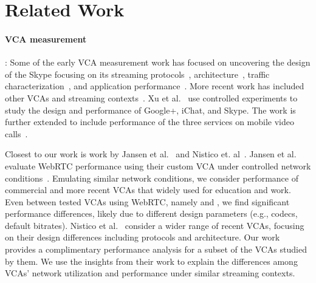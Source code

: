 \section{Related Work}\label{sec:related}

\paragraph{VCA measurement}: Some of the early VCA measurement work has focused on uncovering the design of the Skype focusing on its streaming protocols~\cite{baset2004analysis}, architecture~\cite{guha2005experimental}, traffic characterization~\cite{bonfiglio2008tracking}, and application performance~\cite{hossfeld2008analysis}. More recent work has included other VCAs and streaming contexts~\cite{xu2012video, yu2014can, azfar2016android}. Xu et al.~\cite{xu2012video} use controlled experiments to study the design and performance of Google+, iChat, and Skype. The work is further extended to include performance of the three services on mobile video calls~\cite{yu2014can}. 

Closest to our work is work by Jansen et al.~\cite{jansen2018performance} and Nistico et. al~\cite{nistico2020comparative}. Jansen et al. evaluate WebRTC performance using their custom VCA under controlled network conditions~\cite{jansen2018performance}. Emulating similar network conditions, we consider performance of commercial and more recent VCAs that widely used for education and work. Even between tested VCAs using WebRTC, namely \meet and \teamsbrowser, we find significant performance differences, likely due to different design parameters (e.g., codecs, default bitrates). Nistico et al.~\cite{nistico2020comparative} consider a wider range of recent VCAs, focusing on their design differences including protocols and architecture. Our work provides a complimentary performance analysis for a subset of the VCAs studied by them. We use the insights from their work to explain the differences among VCAs' network utilization and performance under similar streaming contexts. 

